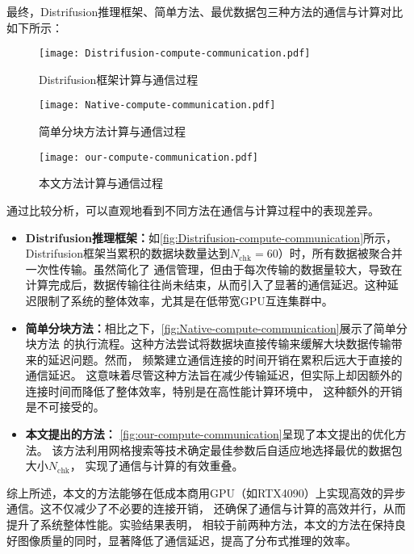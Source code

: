 \par
最终，Distrifusion推理框架、简单方法、最优数据包三种方法的通信与计算对比如下所示：
\begin{figure}[ht]
    \centering
    \texttt{[image: Distrifusion-compute-communication.pdf]}
    \caption{Distrifusion框架计算与通信过程}
    \label{fig:Distrifusion-compute-communication}
\end{figure}
\begin{figure}[ht]
    \centering
    \texttt{[image: Native-compute-communication.pdf]}
    \caption{简单分块方法计算与通信过程}
    \label{fig:Native-compute-communication}
\end{figure}
\begin{figure}[ht]
    \centering
    \texttt{[image: our-compute-communication.pdf]}
    \caption{本文方法计算与通信过程}
    \label{fig:our-compute-communication}
\end{figure}
\par
通过比较分析，可以直观地看到不同方法在通信与计算过程中的表现差异。
\begin{itemize}
    \item \textbf{Distrifusion推理框架：}如\autoref{fig:Distrifusion-compute-communication}所示，
    Distrifusion框架当累积的数据块数量达到$N_{\text{chk}}=60$）时，所有数据被聚合并一次性传输。虽然简化了
    通信管理，但由于每次传输的数据量较大，导致在计算完成后，数据传输往往尚未结束，从而引入了显著的通信延迟。这种延
    迟限制了系统的整体效率，尤其是在低带宽GPU互连集群中。
    \item \textbf{简单分块方法：}相比之下，\autoref{fig:Native-compute-communication}展示了简单分块方法
    的执行流程。这种方法尝试将数据块直接传输来缓解大块数据传输带来的延迟问题。然而，
    频繁建立通信连接的时间开销在累积后远大于直接的通信延迟。
    这意味着尽管这种方法旨在减少传输延迟，但实际上却因额外的连接时间而降低了整体效率，特别是在高性能计算环境中，
    这种额外的开销是不可接受的。
    \item \textbf{本文提出的方法：}
    \autoref{fig:our-compute-communication}呈现了本文提出的优化方法。
    该方法利用网格搜索等技术确定最佳参数后自适应地选择最优的数据包大小$N_{\text{chk}}$，
    实现了通信与计算的有效重叠。
\end{itemize}
\par
综上所述，本文的方法能够在低成本商用GPU（如RTX4090）上实现高效的异步通信。这不仅减少了不必要的连接开销，
还确保了通信与计算的高效并行，从而提升了系统整体性能。实验结果表明，
相较于前两种方法，本文的方法在保持良好图像质量的同时，显著降低了通信延迟，提高了分布式推理的效率。


